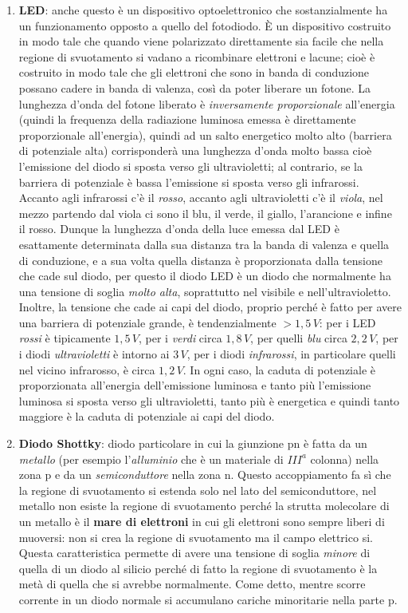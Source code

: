 \documentclass[12pt, a4paper]{report}
\begin{document}
\begin{enumerate}
    \item \textbf{LED}: anche questo è un dispositivo optoelettronico che sostanzialmente ha un funzionamento opposto a quello del fotodiodo. È un dispositivo costruito in modo tale che quando viene polarizzato direttamente sia facile che nella regione di svuotamento si vadano a ricombinare elettroni e lacune; cioè è costruito in modo tale che gli elettroni che sono in banda di conduzione possano cadere in banda di valenza, così da poter liberare un fotone. La lunghezza d'onda del fotone liberato è \textit{inversamente proporzionale} all'energia (quindi la frequenza della radiazione luminosa emessa è direttamente proporzionale all'energia), quindi ad un salto energetico molto alto (barriera di potenziale alta) corrisponderà una lunghezza d'onda molto bassa cioè l'emissione del diodo si sposta verso gli ultravioletti; al contrario, se la barriera di potenziale è bassa l'emissione si sposta verso gli infrarossi. Accanto agli infrarossi c'è il \textit{rosso}, accanto agli ultravioletti c'è il \textit{viola}, nel mezzo partendo dal viola ci sono il blu, il verde, il giallo, l'arancione e infine il rosso. Dunque la lunghezza d'onda della luce emessa dal LED è esattamente determinata dalla sua distanza tra la banda di valenza e quella di conduzione, e a sua volta quella distanza è proporzionata dalla tensione che cade sul diodo, per questo il diodo LED è un diodo che normalmente ha una tensione di soglia \textit{molto alta}, soprattutto nel visibile e nell'ultravioletto. Inoltre, la tensione che cade ai capi del diodo, proprio perché è fatto per avere una barriera di potenziale grande, è tendenzialmente $> 1,5\,V$: per i LED \textit{rossi} è tipicamente $1,5\,V$, per i \textit{verdi} circa $1,8\,V$, per quelli \textit{blu} circa $2,2\,V$, per i diodi \textit{ultravioletti} è intorno ai $3\,V$, per i diodi \textit{infrarossi}, in particolare quelli nel vicino infrarosso, è circa $1,2\,V$. In ogni caso, la caduta di potenziale è proporzionata all'energia dell'emissione luminosa e tanto più l'emissione luminosa si sposta verso gli ultravioletti, tanto più è energetica e quindi tanto maggiore è la caduta di potenziale ai capi del diodo.
    \item \textbf{Diodo Shottky}: diodo particolare in cui la giunzione pn è fatta da un \textit{metallo} (per esempio l'\textit{alluminio} che è un materiale di $III^{a}$ colonna) nella zona p e da un \textit{semiconduttore} nella zona n. Questo accoppiamento fa sì che la regione di svuotamento si estenda solo nel lato del semiconduttore, nel metallo non esiste la regione di svuotamento perché la strutta molecolare di un metallo è il \textbf{mare di elettroni} in cui gli elettroni sono sempre liberi di muoversi: non si crea la regione di svuotamento ma il campo elettrico si. Questa caratteristica permette di avere una tensione di soglia \textit{minore} di quella di un diodo al silicio perché di fatto la regione di svuotamento è la metà di quella che si avrebbe normalmente. Come detto, mentre scorre corrente in un diodo normale si accumulano cariche minoritarie nella parte p.

\end{enumerate}
\end{document}
